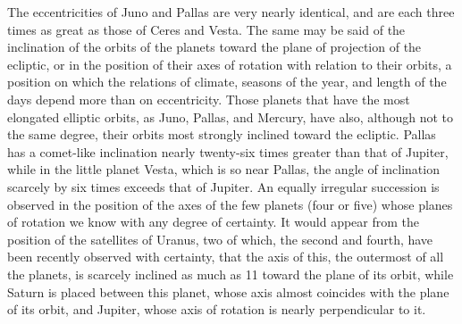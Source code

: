 The eccentricities of Juno and Pallas are very nearly identical, and are each three times as great as those of Ceres and Vesta. The same may be said of the inclination of the orbits of the planets toward the plane of projection of the ecliptic, or in the position of their axes of rotation with relation to their orbits, a position on which the relations of climate, seasons of the year, and length of the days depend more than on eccentricity. Those planets that have the most elongated elliptic orbits, as Juno, Pallas, and Mercury, have also, although not to the same degree, their orbits most strongly inclined toward the ecliptic. Pallas has a comet-like inclination nearly twenty-six times greater than that of Jupiter, while in the little planet Vesta, which is so near Pallas, the angle of inclination scarcely by six times exceeds that of Jupiter. An equally irregular succession is observed in the position of the axes of the few planets (four or five) whose planes of rotation we know with any degree of certainty. It would appear from the position of the satellites of Uranus, two of which, the second and fourth, have been recently observed with certainty, that the axis of this, the outermost of all the planets, is scarcely inclined as much as 11 toward the plane of its orbit, while Saturn is placed between this planet, whose axis almost coincides with the plane of its orbit, and Jupiter, whose axis of rotation is nearly perpendicular to it.

